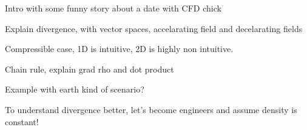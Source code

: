 \documentclass{article}
\begin{document}
Intro with some funny story about a date with CFD chick

Explain divergence, with vector spaces, accelarating field and decelarating fields

Compressible case, 1D is intuitive, 2D is highly non intuitive.

Chain rule, explain grad rho and dot product

Example with earth kind of scenario?



To understand divergence better, let's become engineers and assume density is constant!
\end{document}
